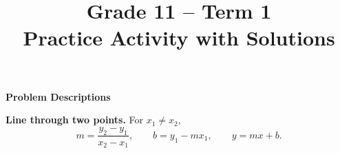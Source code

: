 \makeatletter
{}
\makeatother






\title{Grade 11 -- Term 1 \\ Practice Activity with Solutions}
\author{}
\date{}

\pagestyle{empty}

\newcommand{\SolvedGraph}[2]{%
	\par\smallskip
	\Needspace{4.6cm}%
	\begin{center}
		\textbf{\small #1}\par\vspace{-1mm}
		\resizebox{0.39\textwidth}{!}{%
			\begin{minipage}{10cm}
				#2
			\end{minipage}%
		}
	\end{center}
	\vspace{-2mm}%
}

\newcommand{\SolutionStage}[2]{%
	\Needspace{6\baselineskip}%
	\subsection{#2}%
}


	
	
	
	\vspace*{-15mm}
	
	\begin{center}
		{\large\bfseries Problem Descriptions}
	\end{center}
	
	\vspace{-4mm}
	
	\noindent\textbf{Line through two points.}  For $x_1\ne x_2$,
	\[
	m=\frac{y_2-y_1}{x_2-x_1},\qquad
	b=y_1-mx_1,\qquad
	y=mx+b.
	\]
	
